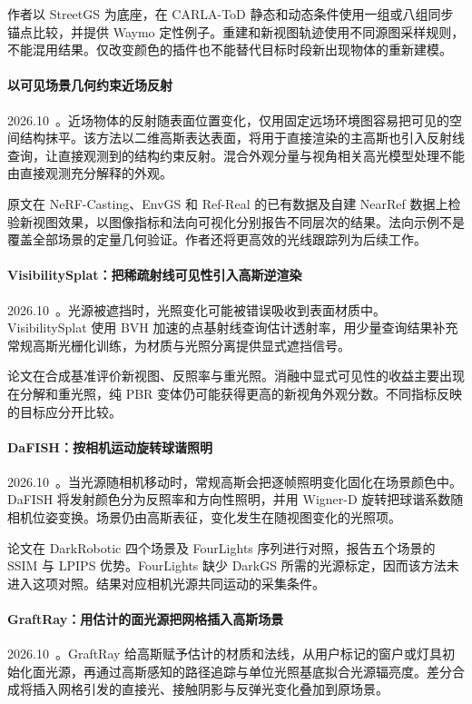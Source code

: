 作者以 StreetGS 为底座，在 CARLA-ToD 静态和动态条件使用一组或八组同步锚点比较，并提供 Waymo 定性例子。重建和新视图轨迹使用不同源图采样规则，不能混用结果。仅改变颜色的插件也不能替代目标时段新出现物体的重新建模。

\paragraph{以可见场景几何约束近场反射}
2026.10~\cite{2610_13757}。近场物体的反射随表面位置变化，仅用固定远场环境图容易把可见的空间结构抹平。该方法以二维高斯表达表面，将用于直接渲染的主高斯也引入反射线查询，让直接观测到的结构约束反射。混合外观分量与视角相关高光模型处理不能由直接观测充分解释的外观。

原文在 NeRF-Casting、EnvGS 和 Ref-Real 的已有数据及自建 NearRef 数据上检验新视图效果，以图像指标和法向可视化分别报告不同层次的结果。法向示例不是覆盖全部场景的定量几何验证。作者还将更高效的光线跟踪列为后续工作。

\paragraph{VisibilitySplat：把稀疏射线可见性引入高斯逆渲染}
2026.10~\cite{2610_19847}。光源被遮挡时，光照变化可能被错误吸收到表面材质中。VisibilitySplat 使用 BVH 加速的点基射线查询估计透射率，用少量查询结果补充常规高斯光栅化训练，为材质与光照分离提供显式遮挡信号。

论文在合成基准评价新视图、反照率与重光照。消融中显式可见性的收益主要出现在分解和重光照，纯 PBR 变体仍可能获得更高的新视角外观分数。不同指标反映的目标应分开比较。

\paragraph{DaFISH：按相机运动旋转球谐照明}
2026.10~\cite{2610_24811}。当光源随相机移动时，常规高斯会把逐帧照明变化固化在场景颜色中。DaFISH 将发射颜色分为反照率和方向性照明，并用 Wigner-D 旋转把球谐系数随相机位姿变换。场景仍由高斯表征，变化发生在随视图变化的光照项。

论文在 DarkRobotic 四个场景及 FourLights 序列进行对照，报告五个场景的 SSIM 与 LPIPS 优势。FourLights 缺少 DarkGS 所需的光源标定，因而该方法未进入这项对照。结果对应相机光源共同运动的采集条件。

\paragraph{GraftRay：用估计的面光源把网格插入高斯场景}
2026.10~\cite{2610_37036}。GraftRay 给高斯赋予估计的材质和法线，从用户标记的窗户或灯具初始化面光源，再通过高斯感知的路径追踪与单位光照基底拟合光源辐亮度。差分合成将插入网格引发的直接光、接触阴影与反弹光变化叠加到原场景。

